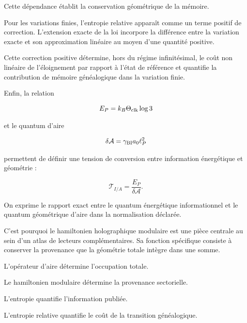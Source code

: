 Cette dépendance établit la conservation géométrique de la mémoire.\par

Pour les variations finies, l'entropie relative apparaît comme un terme positif de correction. L'extension exacte de la loi incorpore la différence entre la variation exacte et son approximation linéaire au moyen d'une quantité positive.\par

Cette correction positive détermine, hors du régime infinitésimal, le coût non linéaire de l'éloignement par rapport à l'état de référence et quantifie la contribution de mémoire généalogique dans la variation finie.\par

Enfin, la relation\par

\[
E_P=k_B\Theta_{\rm clk}\log3
\]

et le quantum d'aire\par

\[
\delta\mathcal A
=
\gamma_{\rm BI}a_0\ell_P^2
\]

permettent de définir une tension de conversion entre information énergétique et géométrie :\par

\[
\mathcal T_{I/A}
=
\frac{E_P}{\delta\mathcal A}.
\]

On exprime le rapport exact entre le quantum énergétique informationnel et le quantum géométrique d'aire dans la normalisation déclarée.\par

C'est pourquoi le hamiltonien holographique modulaire est une pièce centrale au sein d'un atlas de lecteurs complémentaires. Sa fonction spécifique consiste à conserver la provenance que la géométrie totale intègre dans une somme.\par

L'opérateur d'aire détermine l'occupation totale.\par
Le hamiltonien modulaire détermine la provenance sectorielle.\par
L'entropie quantifie l'information publiée.\par
L'entropie relative quantifie le coût de la transition généalogique.\par
